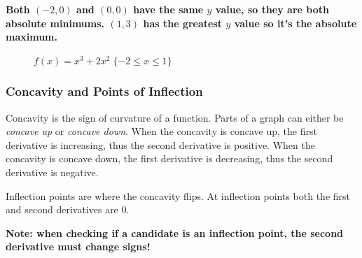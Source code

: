 \documentclass[12pt]{article}
\begin{document}
\noindent \textbf{Both $(-2, 0)$ and $(0, 0)$ have the same $y$ value, so they are both absolute minimums. $(1, 3)$ has the greatest $y$ value so it's the absolute maximum.}
\begin{figure}[H]
    \begin{center}
        \caption{$f(x) = x^3 + 2x^2 \; \{-2 \le x \le 1 \}$}
        \label{fig:absextremaclosed}
    \end{center}
\end{figure}

\subsubsection{Concavity and Points of Inflection}
Concavity is the sign of curvature of a function. Parts of a graph can either be \textit{concave up} or \textit{concave down}. When the concavity is concave up, the first derivative is increasing, thus the second derivative is positive. When the concavity is concave down, the first derivative is decreasing, thus the second derivative is negative.

Inflection points are where the concavity flips. At inflection points both the first and second derivatives are $0$.

\noindent \textbf{Note: when checking if a candidate is an inflection point, the second derivative must change signs!}
\end{document}
